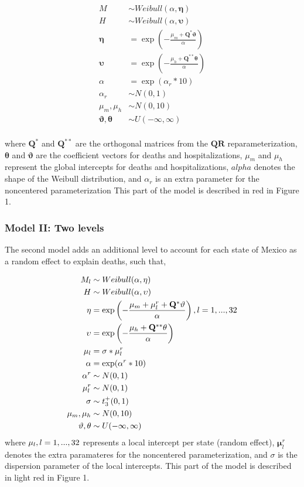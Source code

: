 \documentclass[10pt,letterpaper]{article}
\begin{document}
\[
\begin{aligned}
 {M}  &\sim Weibull(\alpha,\mathbf{\eta})\\
 {H}  &\sim Weibull(\alpha,\mathbf{\upsilon}) \\
 \mathbf{\eta} &= \exp\left(-\frac{\mu_m+\mathbf{Q}^*\mathbf{\vartheta}}{\alpha}\right) \\
 \mathbf{\upsilon} &= \exp\left(-\frac{\mu_h+\mathbf{Q}^{**}\mathbf{\theta}}{\alpha}\right) \\
 \alpha&=\exp(\alpha_r*10) \\
 \alpha_r&\sim N(0,1) \\
 \mu_m,\mu_h &\sim N(0,10) \\
 \mathbf{\vartheta},\mathbf{\theta} &\sim U(-\infty,\infty) \\
\end{aligned}
\]

where \(\mathbf{Q}^*\) and \(\mathbf{Q}^{**}\) are the orthogonal
matrices from the \(\mathbf{QR}\) reparameterization,
\(\mathbf{\theta}\) and \(\mathbf{\vartheta}\) are the coefficient
vectors for deaths and hospitalizations, \(\mu_m\) and \(\mu_h\)
represent the global intercepts for deaths and hospitalizations,
\(alpha\) denotes the shape of the Weibull distribution, and
\(\alpha_r\) is an extra parameter for the noncentered parameterization
This part of the model is described in red in Figure 1.

\hypertarget{model-ii-two-levels}{%
\subsubsection{Model II: Two levels}\label{model-ii-two-levels}}

The second model adds an additional level to account for each state of
Mexico as a random effect to explain deaths, such that,

\[
\begin{aligned}
 M_l   &\sim Weibull(\alpha,\mathbf{\eta})\\
 H  &\sim Weibull(\alpha,\mathbf{\upsilon}) \\
 \mathbf{\eta} &= \exp\left(-\frac{\mu_m+\mathbf{\mu}_l^r+\mathbf{Q}^*\mathbf{\vartheta}}{\alpha}\right),\space\space l=1,...,32\\
 \mathbf{\upsilon} &= \exp\left(-\frac{\mu_h+\mathbf{Q}^{**}\mathbf{\theta}}{\alpha}\right) \\
 \mathbf{\mu}_l&=\sigma*\mathbf{\mu}_l^r \\
 \alpha&=\exp(\alpha^r*10) \\
 \alpha^r&\sim N(0,1) \\
 \mu^r_l&\sim N(0,1) \\
 \sigma&\sim t^+_3(0,1) \\
 \mu_m,\mu_h &\sim N(0,10) \\
 \mathbf{\vartheta},\mathbf{\theta} &\sim U(-\infty,\infty) \\
\end{aligned}
\] where \(\mathbf{\mu}_l, \space l=1,...,32\) represents a local
intercept per state (random effect), \(\mathbf{\mu}^r_l\) denotes the
extra paramateres for the noncentered parameterization, and \(\sigma\)
is the dispersion parameter of the local intercepts. This part of the
model is described in light red in Figure 1.
\end{document}
